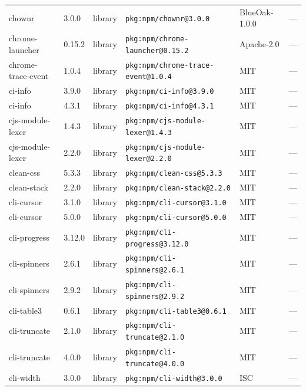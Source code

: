 \documentclass[11pt,a4paper]{article}
\begin{document}
\begin{longtable}{|p{4cm}|p{2cm}|p{1.6cm}|p{5cm}|p{1.5cm}|p{3.5cm}|}
\raggedright chownr & 3.0.0 & library & \small\texttt{pkg:npm/chownr@3.0.0} & BlueOak-1.0.0 & \small — \\
\raggedright chrome-launcher & 0.15.2 & library & \small\texttt{pkg:npm/chrome-launcher@0.15.2} & Apache-2.0 & \small — \\
\raggedright chrome-trace-event & 1.0.4 & library & \small\texttt{pkg:npm/chrome-trace-event@1.0.4} & MIT & \small — \\
\raggedright ci-info & 3.9.0 & library & \small\texttt{pkg:npm/ci-info@3.9.0} & MIT & \small — \\
\raggedright ci-info & 4.3.1 & library & \small\texttt{pkg:npm/ci-info@4.3.1} & MIT & \small — \\
\raggedright cjs-module-lexer & 1.4.3 & library & \small\texttt{pkg:npm/cjs-module-lexer@1.4.3} & MIT & \small — \\
\raggedright cjs-module-lexer & 2.2.0 & library & \small\texttt{pkg:npm/cjs-module-lexer@2.2.0} & MIT & \small — \\
\raggedright clean-css & 5.3.3 & library & \small\texttt{pkg:npm/clean-css@5.3.3} & MIT & \small — \\
\raggedright clean-stack & 2.2.0 & library & \small\texttt{pkg:npm/clean-stack@2.2.0} & MIT & \small — \\
\raggedright cli-cursor & 3.1.0 & library & \small\texttt{pkg:npm/cli-cursor@3.1.0} & MIT & \small — \\
\raggedright cli-cursor & 5.0.0 & library & \small\texttt{pkg:npm/cli-cursor@5.0.0} & MIT & \small — \\
\raggedright cli-progress & 3.12.0 & library & \small\texttt{pkg:npm/cli-progress@3.12.0} & MIT & \small — \\
\raggedright cli-spinners & 2.6.1 & library & \small\texttt{pkg:npm/cli-spinners@2.6.1} & MIT & \small — \\
\raggedright cli-spinners & 2.9.2 & library & \small\texttt{pkg:npm/cli-spinners@2.9.2} & MIT & \small — \\
\raggedright cli-table3 & 0.6.1 & library & \small\texttt{pkg:npm/cli-table3@0.6.1} & MIT & \small — \\
\raggedright cli-truncate & 2.1.0 & library & \small\texttt{pkg:npm/cli-truncate@2.1.0} & MIT & \small — \\
\raggedright cli-truncate & 4.0.0 & library & \small\texttt{pkg:npm/cli-truncate@4.0.0} & MIT & \small — \\
\raggedright cli-width & 3.0.0 & library & \small\texttt{pkg:npm/cli-width@3.0.0} & ISC & \small — \\

\end{longtable}
\end{document}
